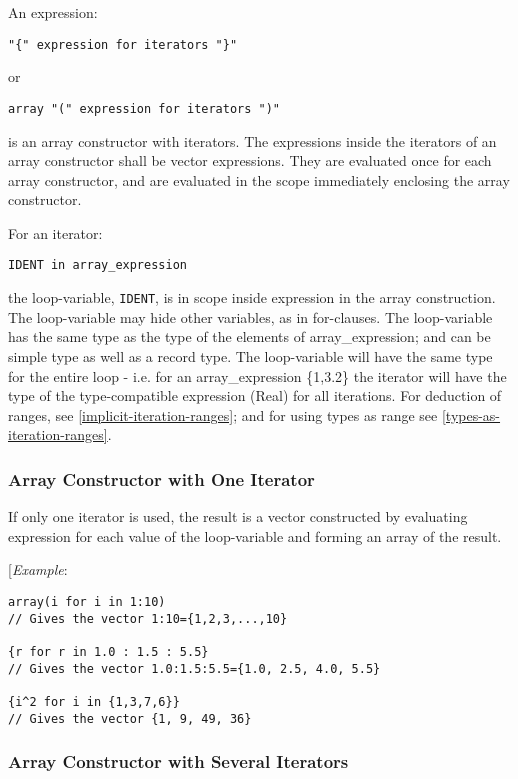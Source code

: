 An expression:
\begin{lstlisting}[language=grammar]
"{" expression for iterators "}"
\end{lstlisting}
or
\begin{lstlisting}[language=grammar]
array "(" expression for iterators ")"
\end{lstlisting}

is an array constructor with iterators. The expressions inside the
iterators of an array constructor shall be vector expressions. They are
evaluated once for each array constructor, and are evaluated in the
scope immediately enclosing the array constructor.

For an iterator:
\begin{lstlisting}[language=modelica]
IDENT in array_expression
\end{lstlisting}

the loop-variable, \lstinline!IDENT!, is in scope inside expression in the array
construction. The loop-variable may hide other variables, as in
for-clauses. The loop-variable has the same type as the type of the
elements of array\_expression; and can be simple type as well as a
record type. The loop-variable will have the same type for the entire
loop - i.e. for an array\_expression \{1,3.2\} the iterator will have
the type of the type-compatible expression (Real) for all iterations.
For deduction of ranges, see \autoref{implicit-iteration-ranges}; and for using types as
range see \autoref{types-as-iteration-ranges}.

\subsubsection{Array Constructor with One Iterator}

If only one iterator is used, the result is a vector constructed by
evaluating expression for each value of the loop-variable and forming an
array of the result.

{[}\emph{Example}:
\begin{lstlisting}[language=modelica]
array(i for i in 1:10)
// Gives the vector 1:10={1,2,3,...,10}

{r for r in 1.0 : 1.5 : 5.5}
// Gives the vector 1.0:1.5:5.5={1.0, 2.5, 4.0, 5.5}

{i^2 for i in {1,3,7,6}}
// Gives the vector {1, 9, 49, 36}
\end{lstlisting}
\subsubsection{Array Constructor with Several Iterators}


